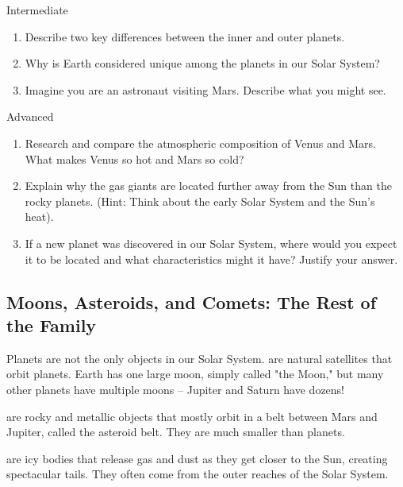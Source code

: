 \begin{tieredquestions}{Intermediate}
\begin{enumerate}
    \item Describe two key differences between the inner and outer planets.
    \item Why is Earth considered unique among the planets in our Solar System?
    \item  Imagine you are an astronaut visiting Mars. Describe what you might see.
\end{enumerate}
\end{tieredquestions}

\begin{tieredquestions}{Advanced}
\begin{enumerate}
    \item Research and compare the atmospheric composition of Venus and Mars. What makes Venus so hot and Mars so cold?
    \item  Explain why the gas giants are located further away from the Sun than the rocky planets. (Hint: Think about the early Solar System and the Sun's heat).
    \item  If a new planet was discovered in our Solar System, where would you expect it to be located and what characteristics might it have? Justify your answer.
\end{enumerate}
\end{tieredquestions}


\subsection{Moons, Asteroids, and Comets: The Rest of the Family}

Planets are not the only objects in our Solar System.   are natural satellites that orbit planets. Earth has one large moon, simply called "the Moon," but many other planets have multiple moons – Jupiter and Saturn have dozens!

 are rocky and metallic objects that mostly orbit in a belt between Mars and Jupiter, called the asteroid belt. They are much smaller than planets.

 are icy bodies that release gas and dust as they get closer to the Sun, creating spectacular tails. They often come from the outer reaches of the Solar System.

